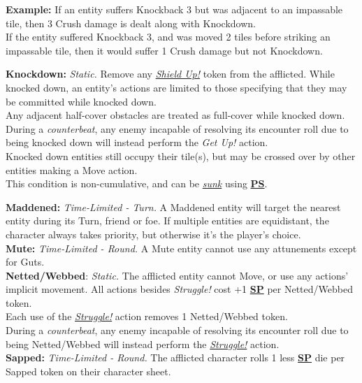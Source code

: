 \documentclass[12pt]{article}
\newcommand{\refto}[1]{\hyperlink{#1}{\textbf{#1}}}
\newcommand{\reftoit}[1]{\hyperlink{#1}{\emph{#1}}}
\begin{document}
\begin{multicols*}{2}
\begin{tcolorbox}
\textbf{Example:} If an entity suffers Knockback 3 but was adjacent to an impassable tile, then 3 Crush damage is dealt along with Knockdown.\\
If the entity suffered Knockback 3, and was moved 2 tiles before striking an impassable tile, then it would suffer 1 Crush damage but not Knockdown.
\end{tcolorbox}

\textbf{Knockdown:} \emph{Static.} Remove any \reftoit{Shield Up!} token from the afflicted. While knocked down, an entity’s actions are limited to those specifying that they may be committed while knocked down.\\
Any adjacent half-cover obstacles are treated as full-cover while knocked down.\\
During a \emph{counterbeat}, any enemy incapable of resolving its encounter roll due to being knocked down will instead perform the \emph{Get Up!} action.\\
Knocked down entities still occupy their tile(s), but may be crossed over by other entities making a Move action.\\
This condition is non-cumulative, and can be \reftoit{sunk} using \refto{PS}.

\textbf{Maddened:} \emph{Time-Limited - Turn.} A Maddened entity will target the nearest entity during its Turn, friend or foe. If multiple entities are equidistant, the character always takes priority, but otherwise it’s the player’s choice.\\

\textbf{Mute:} \emph{Time-Limited - Round.} A Mute entity cannot use any attunements except for Guts.\\

\textbf{Netted/Webbed}: \emph{Static.} The afflicted entity cannot Move, or use any actions’ implicit movement. All actions besides \emph{Struggle!} cost +1 \refto{SP} per Netted/Webbed token.\\
Each use of the \reftoit{Struggle!} action removes 1 Netted/Webbed token.\\
During a \emph{counterbeat}, any enemy incapable of resolving its encounter roll due to being Netted/Webbed will instead perform the \reftoit{Struggle!} action.\\

\textbf{Sapped:} \emph{Time-Limited - Round.} The afflicted character rolls 1 less \refto{SP} die per Sapped token on their character sheet.\\


\end{multicols*}
\end{document}
